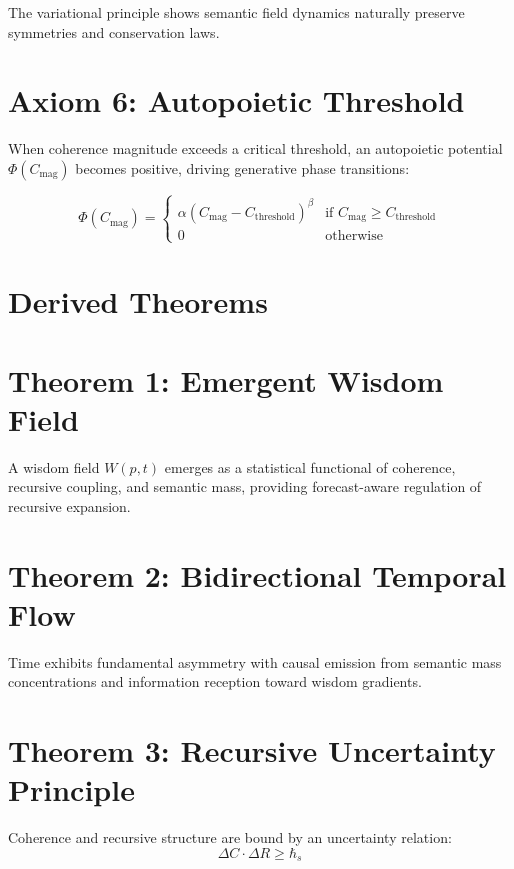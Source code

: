 The variational principle \autocite{GoldsteinPooleSafko2002, Arnold1989} shows semantic field dynamics naturally preserve symmetries and conservation laws.

\section{Axiom 6: Autopoietic Threshold}

When coherence magnitude exceeds a critical threshold, an autopoietic potential \(\Phi(C_{\text{mag}})\) becomes positive, driving generative phase transitions:

\begin{equation}
\Phi(C_{\text{mag}}) = \begin{cases}
\alpha (C_{\text{mag}} - C_{\text{threshold}})^{\beta} & \text{if } C_{\text{mag}} \geq C_{\text{threshold}} \\
0 & \text{otherwise}
\end{cases}
\end{equation}

\section{Derived Theorems}

\section{Theorem 1: Emergent Wisdom Field}
A wisdom field \(W(p,t)\) emerges as a statistical functional of coherence, recursive coupling, and semantic mass, providing forecast-aware regulation of recursive expansion.

\section{Theorem 2: Bidirectional Temporal Flow}
Time exhibits fundamental asymmetry with causal emission from semantic mass concentrations and information reception toward wisdom gradients.

\section{Theorem 3: Recursive Uncertainty Principle}
Coherence and recursive structure are bound by an uncertainty relation:
\begin{equation}
\Delta C \cdot \Delta R \geq \hbar_s
\end{equation}


